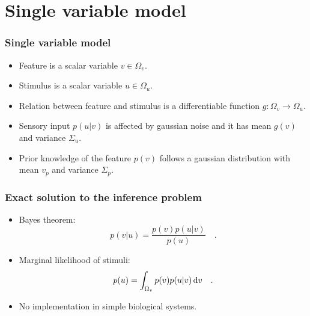 \documentclass[aspectratio=43]{beamer}
\begin{document}
\section{Single variable model}
\begin{frame}
  \frametitle{Single variable model}
  \begin{itemize}
    \item<1-> Feature is a scalar variable $v \in \Omega_v$.
    \item<1-> Stimulus is a scalar variable $u \in \Omega_u$.
    \item<2-> Relation between feature and stimulus is a differentiable function $g : \Omega_v \to \Omega_u$.
    \item<3-> Sensory input $p(u | v)$ is affected by gaussian noise and it has mean $g(v)$ and variance $\Sigma_u$.
    \item<4-> Prior knowledge of the feature $p(v)$ follows a gaussian distribution with mean $v_p$ and variance $\Sigma_p$.
  \end{itemize}
\end{frame}

\begin{frame}
  \frametitle{Exact solution to the inference problem}
  \begin{itemize}
    \item<1-> Bayes theorem:
      \begin{equation}
        \label{eq:bayes}
        p(v | u) = \frac{p(v) p(u | v)}{p(u)}
        \quad .
      \end{equation}
    \item<2-> Marginal likelihood of stimuli:
      \begin{equation}
        \label{eq:marginal}
        p(u) = \int_{\Omega_v} p(v) p(u | v) \odif{v}
        \quad .
      \end{equation}
    \item<3-> No implementation in simple biological systems.
  \end{itemize}
\end{frame}
\end{document}
